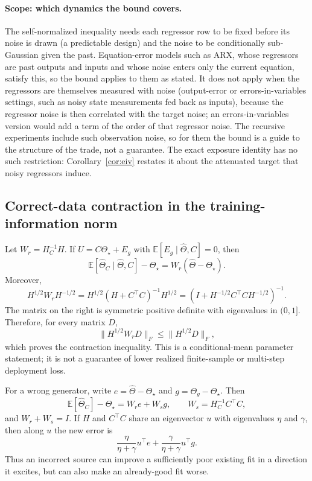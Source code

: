 \paragraph{Scope: which dynamics the bound covers.} The self-normalized inequality needs each regressor row to be fixed before its noise is drawn (a predictable design) and the noise to be conditionally sub-Gaussian given the past. Equation-error models such as ARX, whose regressors are past outputs and inputs and whose noise enters only the current equation, satisfy this, so the bound applies to them as stated. It does not apply when the regressors are themselves measured with noise (output-error or errors-in-variables settings, such as noisy state measurements fed back as inputs), because the regressor noise is then correlated with the target noise; an errors-in-variables version would add a term of the order of that regressor noise. The recursive experiments include such observation noise, so for them the bound is a guide to the structure of the trade, not a guarantee. The exact exposure identity has no such restriction: Corollary~\ref{cor:eiv} restates it about the attenuated target that noisy regressors induce.

\subsection{Correct-data contraction in the training-information norm}
Let $W_r=H_C^{-1}H$. If $U=C\Theta_\star+E_g$ with $\mathbb E[E_g\mid\widehat\Theta,C]=0$, then
\[
\mathbb E[\widehat\Theta_C\mid\widehat\Theta,C]-\Theta_\star=W_r(\widehat\Theta-\Theta_\star).
\]
Moreover,
\[
H^{1/2}W_rH^{-1/2}=H^{1/2}(H+C^\top C)^{-1}H^{1/2}
=(I+H^{-1/2}C^\top C H^{-1/2})^{-1}.
\]
The matrix on the right is symmetric positive definite with eigenvalues in $(0,1]$. Therefore, for every matrix $D$,
\[
\|H^{1/2}W_rD\|_F\le \|H^{1/2}D\|_F,
\]
which proves the contraction inequality. This is a conditional-mean parameter statement; it is not a guarantee of lower realized finite-sample or multi-step deployment loss.

For a wrong generator, write $e=\widehat\Theta-\Theta_\star$ and $g=\Theta_g-\Theta_\star$. Then
\[
\mathbb E[\widehat\Theta_C]-\Theta_\star=W_re+W_sg,
\qquad W_s=H_C^{-1}C^\top C,
\]
and $W_r+W_s=I$. If $H$ and $C^\top C$ share an eigenvector $u$ with eigenvalues $\eta$ and $\gamma$, then along $u$ the new error is
\[
\frac{\eta}{\eta+\gamma}u^\top e+\frac{\gamma}{\eta+\gamma}u^\top g.
\]
Thus an incorrect source can improve a sufficiently poor existing fit in a direction it excites, but can also make an already-good fit worse.

